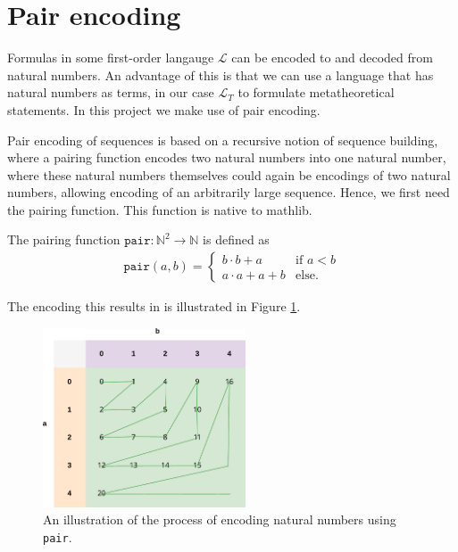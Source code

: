 \section{Pair encoding}
Formulas in some first-order langauge $\mathcal{L}$ can be encoded to and decoded from natural numbers. An advantage of this is that we can use a language that has natural numbers as terms, in our case $\mathcal{L}_T$ to formulate metatheoretical statements. In this project we make use of pair encoding.

Pair encoding of sequences is based on a recursive notion of sequence building, where a pairing function encodes two natural numbers into one natural number, where these natural numbers themselves could again be encodings of two natural numbers, allowing encoding of an arbitrarily large sequence. Hence, we first need the pairing function. This function is native to mathlib.

\begin{definition}\label{def:pair}
    \leanok
    The pairing function $\texttt{pair} : \mathbb{N}^2 \to \mathbb{N}$ is defined as 
    \begin{align*}
        \texttt{pair}(a,b) = \begin{cases}
            b \cdot b + a &\text{if } a < b \\
            a \cdot a + a + b &\text{else}.        
        \end{cases}
    \end{align*}
\end{definition}

The encoding this results in is illustrated in Figure \ref{fig:pairing-table}.

\begin{figure}[h]
    \centering
    \includegraphics[width=6cm]{./img/pairing-table.pdf}
    \caption{An illustration of the process of encoding natural numbers using \texttt{pair}.}
    \label{fig:pairing-table}
\end{figure}


